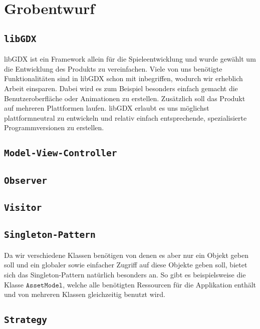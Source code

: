\section{Grobentwurf}

\subsection{\texttt{libGDX}}
libGDX ist ein Framework allein für die Spieleentwicklung und wurde gewählt um die Entwicklung des Produkts zu vereinfachen.
Viele von uns benötigte Funktionalitäten sind in libGDX schon mit inbegriffen, wodurch wir erheblich Arbeit einsparen.
Dabei wird es zum Beispiel besonders einfach gemacht die Benutzeroberfläche oder Animationen zu erstellen.
Zusätzlich soll das Produkt auf mehreren Plattformen laufen. libGDX erlaubt es uns möglichst plattformneutral zu entwickeln 
und relativ einfach entsprechende, spezialisierte Programmversionen zu erstellen.

\subsection{\texttt{Model-View-Controller}}

\subsection{\texttt{Observer}}

\subsection{\texttt{Visitor}}

\subsection{\texttt{Singleton-Pattern}}
Da wir verschiedene Klassen benötigen von denen es aber nur ein Objekt geben soll und ein globaler sowie einfacher Zugriff auf diese Objekte geben soll, bietet sich das Singleton-Pattern natürlich besonders an. So gibt es beispielsweise die Klasse $\texttt{AssetModel}$, welche alle benötigten Ressourcen für die Applikation enthält und von mehreren Klassen gleichzeitig benutzt wird.


\subsection{\texttt{Strategy}}
